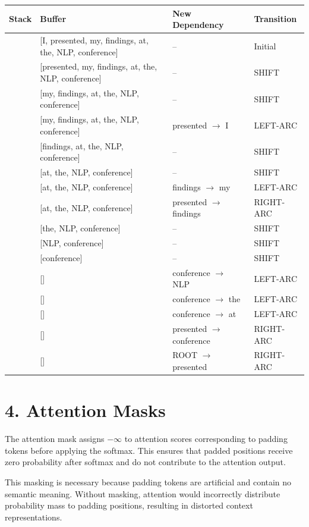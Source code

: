 \documentclass[11pt]{article}
\begin{document}
\begin{center}
\begin{longtable}{|l|l|l|l|}
\hline
\textbf{Stack} & \textbf{Buffer} & \textbf{New Dependency} & \textbf{Transition} \\
\hline
[ROOT] &
[I, presented, my, findings, at, the, NLP, conference] &
-- & Initial \\
\hline
[ROOT, I] &
[presented, my, findings, at, the, NLP, conference] &
-- & SHIFT \\
\hline
[ROOT, I, presented] &
[my, findings, at, the, NLP, conference] &
-- & SHIFT \\
\hline
[ROOT, presented] &
[my, findings, at, the, NLP, conference] &
presented $\rightarrow$ I & LEFT-ARC \\
\hline
[ROOT, presented, my] &
[findings, at, the, NLP, conference] &
-- & SHIFT \\
\hline
[ROOT, presented, my, findings] &
[at, the, NLP, conference] &
-- & SHIFT \\
\hline
[ROOT, presented, findings] &
[at, the, NLP, conference] &
findings $\rightarrow$ my & LEFT-ARC \\
\hline
[ROOT, presented] &
[at, the, NLP, conference] &
presented $\rightarrow$ findings & RIGHT-ARC \\
\hline
[ROOT, presented, at] &
[the, NLP, conference] &
-- & SHIFT \\
\hline
[ROOT, presented, at, the] &
[NLP, conference] &
-- & SHIFT \\
\hline
[ROOT, presented, at, the, NLP] &
[conference] &
-- & SHIFT \\
\hline
[ROOT, presented, at, the, conference] &
[] &
conference $\rightarrow$ NLP & LEFT-ARC \\
\hline
[ROOT, presented, at, conference] &
[] &
conference $\rightarrow$ the & LEFT-ARC \\
\hline
[ROOT, presented, conference] &
[] &
conference $\rightarrow$ at & LEFT-ARC \\
\hline
[ROOT, presented] &
[] &
presented $\rightarrow$ conference & RIGHT-ARC \\
\hline
[ROOT] &
[] &
ROOT $\rightarrow$ presented & RIGHT-ARC \\
\hline
\end{longtable}
\end{center}

\section*{4. Attention Masks}

The attention mask assigns $-\infty$ to attention scores corresponding to padding tokens before applying the softmax. This ensures that padded positions receive zero probability after softmax and do not contribute to the attention output.

This masking is necessary because padding tokens are artificial and contain no semantic meaning. Without masking, attention would incorrectly distribute probability mass to padding positions, resulting in distorted context representations.
\end{document}
